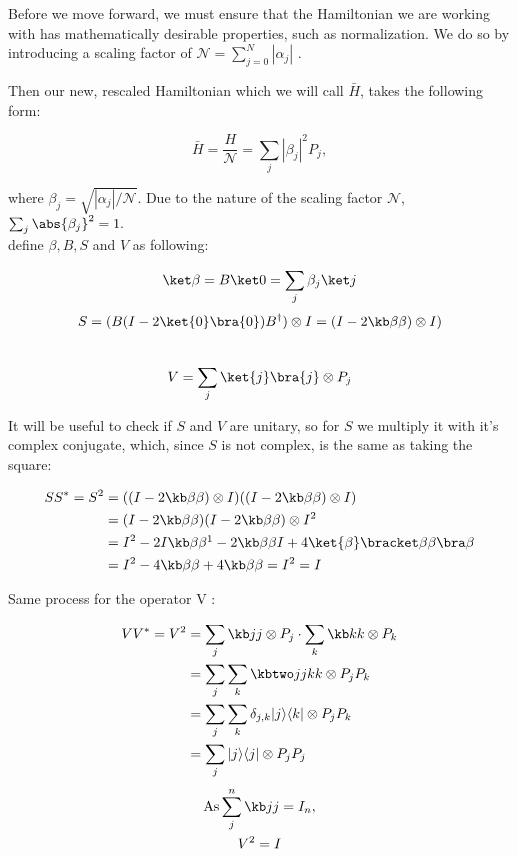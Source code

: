 Before we move forward, we must ensure that the Hamiltonian we are working with has mathematically desirable properties, such as normalization. We do so by introducing a scaling factor of $\mathcal{N} = \sum_{j=0}^N |\alpha_j|$ \cite{poulin}.

Then our new, rescaled Hamiltonian which we will call $\bar{H}$, takes the following form:

\begin{equation}
	\bar H = \frac H{\mathcal{N}} = \sum_j|\beta_j|^2 P_j,
\end{equation}

where $\beta_j = \sqrt{|\alpha_j|/\mathcal{N}}$. Due to the nature of the scaling factor $\mathcal{N}$, $\sum_j \abs{\beta_j}^2 = 1.$
\\\textcite{poulin} define $\beta, B, S$ and  $V$ as following:

$$
\ket\beta = B\ket 0 = \sum_j \beta_j \ket j$$
$$
S = (B (I - 2 \ket{0}\bra{0}) B^{\dagger}) \otimes I= (I-2\kb \beta \beta) \otimes I)$$
\\
$$
V=\sum_{j}\ket{j}\bra{j} \otimes P_{j}
$$

It will be useful to check if $S$ and $V$ are unitary, so for $S$ we multiply it with it's complex conjugate, which, since $S$ is not complex, is the same as taking the square:

\begin{align*}
SS^* = S^2 &= ((I-2\kb \beta \beta) \otimes I)((I-2\kb \beta \beta) \otimes I)\\
&= (I-2\kb \beta \beta)(I-2\kb \beta \beta) \otimes I^2 \\
&= I^2 - 2I\kb \beta \beta\footnotemark - 2\kb \beta \beta I + 4 \ket{\beta} \bracket \beta \beta \bra \beta\\
&= I^2 - 4\kb \beta \beta + 4\kb \beta \beta = I^2 = I
\end{align*}



Same process for the operator $ $V :

\begin{align*}
VV^* = V^2 &= \sum_{j} \kb jj \otimes P_{j} \cdot \sum_{k} \kb kk \otimes P_{k} \\
&= \sum_j \sum_k \kbtwo j j k k \otimes P_j P_k\\
&= \sum_j \sum_k \delta_{j,k} | j \rangle \langle k | \otimes P_j P_k\\
&= \sum_j | j \rangle \langle j | \otimes P_j P_j\\
\end{align*}
\begin{gather*}
\text{As}  \sum_{j}^{n} \kb jj = I_n, \\
V^2 = I
\end{gather*}


